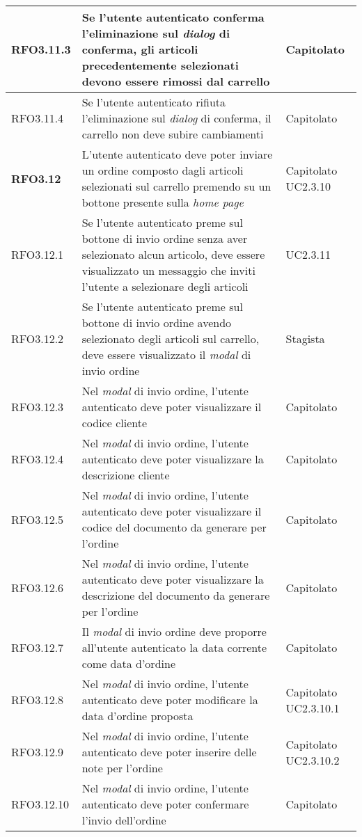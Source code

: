 {\begin{center}
\begin{longtable}{ | >{\centering\arraybackslash}p{2.5cm} | >{\arraybackslash}p{7cm} | >{\centering\arraybackslash}p{2cm} | }
RFO3.11.3 & Se l'utente autenticato conferma l'eliminazione sul \textit{dialog} di conferma, gli articoli precedentemente selezionati devono essere rimossi dal carrello & Capitolato \\ \hline
RFO3.11.4 & Se l'utente autenticato rifiuta l'eliminazione sul \textit{dialog} di conferma, il carrello non deve subire cambiamenti & Capitolato \\ \hline
\textbf{RFO3.12} & L'utente autenticato deve poter inviare un ordine composto dagli articoli selezionati sul carrello premendo su un bottone presente sulla \textit{home page} & Capitolato UC2.3.10\\ \hline
RFO3.12.1 & Se l'utente autenticato preme sul bottone di invio ordine senza aver selezionato alcun articolo, deve essere visualizzato un messaggio che inviti l'utente a selezionare degli articoli & UC2.3.11 \\ \hline
RFO3.12.2 & Se l'utente autenticato preme sul bottone di invio ordine avendo selezionato degli articoli sul carrello, deve essere visualizzato il \textit{modal} di invio ordine & Stagista \\ \hline
RFO3.12.3 & Nel \textit{modal} di invio ordine, l'utente autenticato deve poter visualizzare il codice cliente & Capitolato \\ \hline
RFO3.12.4 & Nel \textit{modal} di invio ordine, l'utente autenticato deve poter visualizzare la descrizione cliente & Capitolato \\ \hline
RFO3.12.5 & Nel \textit{modal} di invio ordine, l'utente autenticato deve poter visualizzare il codice del documento da generare per l'ordine & Capitolato \\ \hline
RFO3.12.6 & Nel \textit{modal} di invio ordine, l'utente autenticato deve poter visualizzare la descrizione del documento da generare per l'ordine & Capitolato \\ \hline
RFO3.12.7 & Il \textit{modal} di invio ordine deve proporre all'utente autenticato la data corrente come data d'ordine & Capitolato \\ \hline
RFO3.12.8 & Nel \textit{modal} di invio ordine, l'utente autenticato deve poter modificare la data d'ordine proposta & Capitolato UC2.3.10.1\\ \hline
RFO3.12.9 & Nel \textit{modal} di invio ordine, l'utente autenticato deve poter inserire delle note per l'ordine & Capitolato UC2.3.10.2\\ \hline
RFO3.12.10 & Nel \textit{modal} di invio ordine, l'utente autenticato deve poter confermare l'invio dell'ordine & Capitolato \\ \hline

\end{longtable}
\end{center}}
